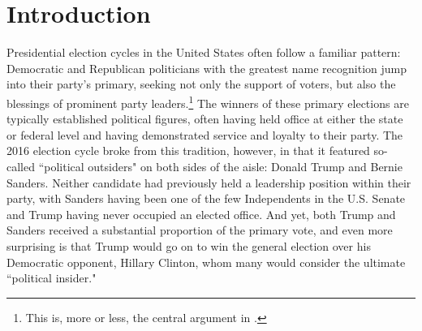\documentclass[12pt]{article}
\begin{document}

\section{Introduction}
Presidential election cycles in the United States often follow a familiar pattern: Democratic and Republican politicians with the greatest name recognition jump into their party's primary, seeking not only the support of voters, but also the blessings of prominent party leaders.\footnote{This is, more or less, the central argument in  \parencite{cohen2009party}.}  The winners of these primary elections are typically established political figures, often having held office at either the state or federal level and having demonstrated service and loyalty to their party. The 2016 election cycle broke from this tradition, however, in that it featured so-called ``political outsiders" on both sides of the aisle: Donald Trump and Bernie Sanders. Neither candidate had previously held a leadership position within their party, with Sanders having been one of the few Independents in the U.S. Senate and Trump having never occupied an elected office. And yet, both Trump and Sanders received a substantial proportion of the primary vote, and even more surprising is that Trump would go on to win the general election over his Democratic opponent, Hillary Clinton, whom many would consider the ultimate ``political insider."
\end{document}

